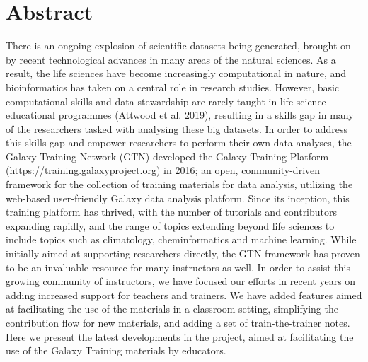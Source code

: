 \documentclass[10pt,letterpaper]{article}
\begin{document}
\section*{Abstract}
There is an ongoing explosion of scientific datasets being generated, brought on by recent technological advances in many areas of the natural sciences.
As a result, the life sciences have become increasingly computational in nature, and bioinformatics has taken on a central role in research studies.
However, basic computational skills and data stewardship are rarely taught in life science educational programmes (Attwood et al. 2019), resulting in a skills gap in many of the researchers tasked with analysing these big datasets.
In order to address this skills gap and empower researchers to perform their own data analyses, the Galaxy Training Network (GTN) developed the Galaxy Training Platform (https://training.galaxyproject.org) in 2016; an open, community-driven framework for the collection of training materials for data analysis, utilizing the web-based user-friendly Galaxy data analysis platform.
Since its inception, this training platform has thrived, with the number of tutorials and contributors expanding rapidly, and the range of topics extending beyond life sciences to include topics such as climatology, cheminformatics and machine learning.
While initially aimed at supporting researchers directly, the GTN framework has proven to be an invaluable resource for many instructors as well. In order to assist this growing community of instructors, we have focused our efforts in recent years on adding increased support for teachers and trainers.
We have added features aimed at facilitating the use of the materials in a classroom setting, simplifying the contribution flow for new materials, and adding a set of train-the-trainer notes.
Here we present the latest developments in the project, aimed at facilitating the use of the Galaxy Training materials by educators.


\end{document}
